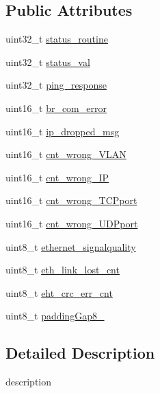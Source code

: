 \subsection*{Public Attributes}
\begin{DoxyCompactItemize}
\item 
uint32\+\_\+t \mbox{\hyperlink{struct_b_r_diag_data_a29727be81df0a5cab888e7c16c78f152}{status\+\_\+routine}}
\item 
uint32\+\_\+t \mbox{\hyperlink{struct_b_r_diag_data_a1b6c0080fff5bddfc534cf9b50d52564}{status\+\_\+val}}
\item 
uint32\+\_\+t \mbox{\hyperlink{struct_b_r_diag_data_a525c855c97fe37dd7447ac2890bb4842}{ping\+\_\+response}}
\item 
uint16\+\_\+t \mbox{\hyperlink{struct_b_r_diag_data_a52ec83c444fe23cc253d2a7b5d788326}{br\+\_\+com\+\_\+error}}
\item 
uint16\+\_\+t \mbox{\hyperlink{struct_b_r_diag_data_acc7b07f207627a8b156283e88d4c7a8e}{ip\+\_\+dropped\+\_\+msg}}
\item 
uint16\+\_\+t \mbox{\hyperlink{struct_b_r_diag_data_a12d116dc3607d10fe1e772435a064857}{cnt\+\_\+wrong\+\_\+\+V\+L\+AN}}
\item 
uint16\+\_\+t \mbox{\hyperlink{struct_b_r_diag_data_a547b4cf3fcd1d5686591da312e375e21}{cnt\+\_\+wrong\+\_\+\+IP}}
\item 
uint16\+\_\+t \mbox{\hyperlink{struct_b_r_diag_data_acfd5368dd58e132b13062dbad9ae2dd8}{cnt\+\_\+wrong\+\_\+\+T\+C\+Pport}}
\item 
uint16\+\_\+t \mbox{\hyperlink{struct_b_r_diag_data_a5835a6a7161d695e1724da1ce9185339}{cnt\+\_\+wrong\+\_\+\+U\+D\+Pport}}
\item 
uint8\+\_\+t \mbox{\hyperlink{struct_b_r_diag_data_a857fefa87840d357d7bb5f2ae82fe25f}{ethernet\+\_\+signalquality}}
\item 
uint8\+\_\+t \mbox{\hyperlink{struct_b_r_diag_data_a39130c14ab5e3e3b638b7ece79b1eadc}{eth\+\_\+link\+\_\+lost\+\_\+cnt}}
\item 
uint8\+\_\+t \mbox{\hyperlink{struct_b_r_diag_data_a2b044ae057e4dd84e91ef6a73ccb9053}{eht\+\_\+crc\+\_\+err\+\_\+cnt}}
\item 
uint8\+\_\+t \mbox{\hyperlink{struct_b_r_diag_data_ad21747ff95da8debf8e9c0bc1c4fcd44}{padding\+Gap8\+\_}}
\end{DoxyCompactItemize}


\subsection{Detailed Description}
description 

